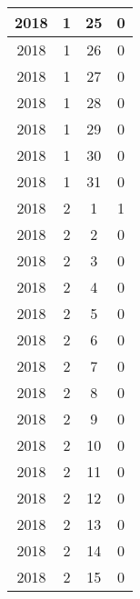 \begin{longtable} {|c|c|c|c|}
\hline
2018         & 1            & 25           & 0                         \\ 
\hline
2018         & 1            & 26           & 0                         \\ 
\hline
2018         & 1            & 27           & 0                         \\ 
\hline
2018         & 1            & 28           & 0                         \\ 
\hline
2018         & 1            & 29           & 0                         \\ 
\hline
2018         & 1            & 30           & 0                         \\ 
\hline
2018         & 1            & 31           & 0                         \\ 
\hline
2018         & 2            & 1            & 1                         \\ 
\hline
2018         & 2            & 2            & 0                         \\ 
\hline
2018         & 2            & 3            & 0                         \\ 
\hline
2018         & 2            & 4            & 0                         \\ 
\hline
2018         & 2            & 5            & 0                         \\ 
\hline
2018         & 2            & 6            & 0                         \\ 
\hline
2018         & 2            & 7            & 0                         \\ 
\hline
2018         & 2            & 8            & 0                         \\ 
\hline
2018         & 2            & 9            & 0                         \\ 
\hline
2018         & 2            & 10           & 0                         \\ 
\hline
2018         & 2            & 11           & 0                         \\ 
\hline
2018         & 2            & 12           & 0                         \\ 
\hline
2018         & 2            & 13           & 0                         \\ 
\hline
2018         & 2            & 14           & 0                         \\ 
\hline
2018         & 2            & 15           & 0                         \\ 

\end{longtable}
